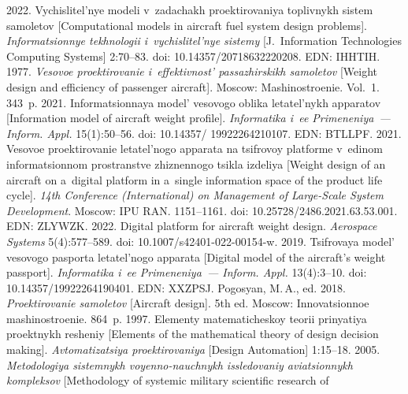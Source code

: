 \begin{multicols}{2}
{{\begin{thebibliography}{99}
 2022. Vychislitel'nye modeli v~zadachakh 
proektirovaniya toplivnykh sis\-tem samoletov [Computational models in aircraft fuel system 
design problems]. \textit{Informatsionnye tekhnologii i~vychislitel'nye sistemy} [J.~Information 
Technologies Computing Systems] 2:70--83. doi: 10.14357/20718632220208. EDN: \mbox{IHHTIH}.
 1977. \textit{Vesovoe proektirovanie i~effektivnost' 
passazhirskikh samoletov} [Weight design and efficiency of passenger aircraft]. Moscow: 
Ma\-shi\-no\-stro\-enie.  Vol.~1. 343~p.
 2021. Informatsionnaya model' vesovogo oblika 
letatel'nykh apparatov [Information model of aircraft weight profile]. \textit{Informatika i~ee 
Primeneniya~--- Inform. Appl.} 15(1):50--56. doi: 10.14357/ 19922264210107. EDN: BTLLPF.
 2021. Vesovoe proektirovanie letatel'nogo 
apparata na tsifrovoy platforme v~edinom informatsionnom prostranstve zhiznennogo tsikla 
izdeliya [Weight design of an aircraft on a~digital platform in a~single information space of the 
product life cycle]. \textit{14th Conference  (International) on Management of Large-Scale System 
Development}. Moscow: IPU RAN. 1151--1161. doi: 10.25728/2486.2021.63.53.001. EDN: 
ZLYWZK.
       2022. Digital platform for aircraft weight design. \textit{Aerospace Systems} 
5(4):577--589. doi: 10.1007/s42401-022-00154-w.
       2019. Tsifrovaya model' 
vesovogo pasporta letatel'nogo apparata [Digital model of the aircraft's weight passport]. 
\textit{Informatika i~ee Primeneniya~--- Inform. Appl.} 13(4):3--10. doi: 
10.14357/19922264190401. EDN: XXZPSJ.
      Pogosyan, M.\,A., ed. 2018. \textit{Proektirovanie samoletov} [Aircraft design]. 5th ed. 
Moscow: Innovatsionnoe ma\-shi\-no\-stro\-enie. 864~p.
       1997.  Elementy 
matematicheskoy teorii prinyatiya pro\-ekt\-nykh resheniy [Elements of the mathematical theory of 
design decision making].  \textit{Avtomatizatsiya pro\-ek\-ti\-ro\-va\-niya} [Design Automation] 1:15--18.
       2005. \textit{Metodologiya sistemnykh voyenno-nauchnykh 
issledovaniy aviatsionnykh kompleksov} [Methodology of systemic military scientific research of 

\end{thebibliography}}}
\end{multicols}
